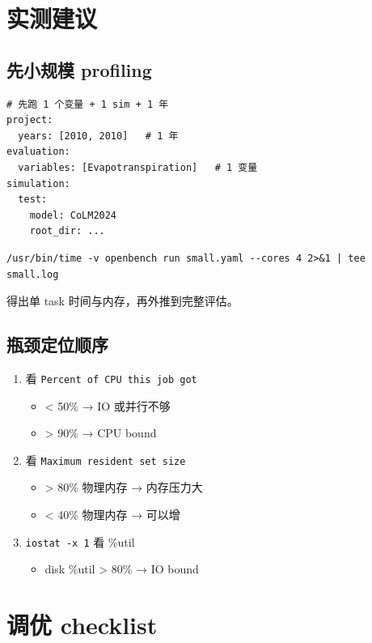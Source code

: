 \section{实测建议}

\subsection{先小规模 profiling}

\begin{verbatim}
# 先跑 1 个变量 + 1 sim + 1 年
project:
  years: [2010, 2010]   # 1 年
evaluation:
  variables: [Evapotranspiration]   # 1 变量
simulation:
  test:
    model: CoLM2024
    root_dir: ...
\end{verbatim}

\begin{verbatim}
/usr/bin/time -v openbench run small.yaml --cores 4 2>&1 | tee small.log
\end{verbatim}

得出单 task 时间与内存，再外推到完整评估。

\subsection{瓶颈定位顺序}

\begin{enumerate}
  \item 看 \texttt{Percent of CPU this job got}
    \begin{itemize}
      \item < 50\% → IO 或并行不够
      \item > 90\% → CPU bound
    \end{itemize}
  \item 看 \texttt{Maximum resident set size}
    \begin{itemize}
      \item > 80\% 物理内存 → 内存压力大
      \item < 40\% 物理内存 → 可以增 
    \end{itemize}
  \item \texttt{iostat -x 1} 看 \%util
    \begin{itemize}
      \item disk \%util > 80\% → IO bound
    \end{itemize}
\end{enumerate}

\section{调优 checklist}

